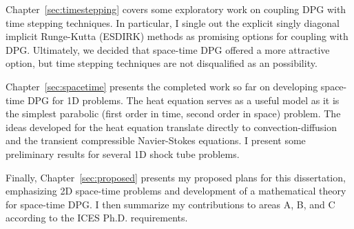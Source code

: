 \documentclass[Proposal.tex]{subfiles}
\begin{document}
Chapter~\ref{sec:timestepping} covers some exploratory work on coupling DPG with time stepping techniques.
In particular, I single out the explicit singly diagonal implicit Runge-Kutta (ESDIRK) methods as promising options for
coupling with DPG.
Ultimately, we decided that space-time DPG offered a more attractive option, but time stepping techniques are not disqualified as an possibility.

Chapter~\ref{sec:spacetime} presents the completed work so far on developing space-time DPG for 1D problems.
The heat equation serves as a useful model as it is the simplest parabolic (first order in time, second order in space) problem.
The ideas developed for the heat equation translate directly to convection-diffusion and the transient compressible Navier-Stokes equations.
I present some preliminary results for several 1D shock tube problems.

Finally, Chapter~\ref{sec:proposed} presents my proposed plans for this dissertation, emphasizing 2D space-time problems and development of 
a mathematical theory for space-time DPG.
I then summarize my contributions to areas A, B, and C according to the ICES Ph.D. requirements.
\end{document}
